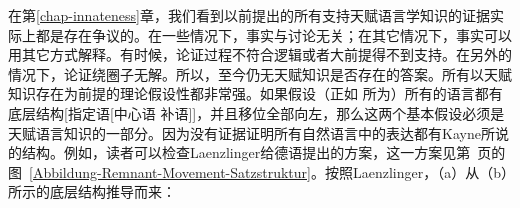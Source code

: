 在第\ref{chap-innateness}章，我们看到以前提出的所有支持天赋语言学知识的证据实际上都是存在争议的。在一些情况下，事实与讨论无关；在其它情况下，事实可以用其它方式解释。有时候，论证过程不符合逻辑或者大前提得不到支持。在另外的情况下，论证绕圈子无解。所以，至今仍无天赋知识是否存在的答案。所有以天赋知识存在为前提的理论假设性都非常强。如果假设（正如 \citet{Kayne94a-u}所为）所有的语言都有底层结构[指定语[中心语 补语]]，并且移位全部向左，那么这两个基本假设必须是天赋语言知识的一部分。因为没有证据证明所有自然语言中的表达都有Kayne所说的结构。例如，读者可以检查Laenzlinger给德语提出的方案\citeyearpar[]{Laenzlinger2004a}，这一方案见第~\pageref{Abbildung-Remnant-Movement-Satzstruktur}页的图~\ref{Abbildung-Remnant-Movement-Satzstruktur}。按照Laenzlinger，（a）从（b）所示的底层结构推导而来：
\eal
{}
